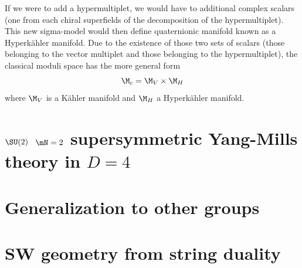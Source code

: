 \documentclass{worksheetclass}
\begin{document}
        If we were to add a hypermultiplet, we would have to additional complex scalars (one from each chiral superfields of the decomposition of the hypermultiplet). This new sigma-model would then define quaternionic manifold known as a Hyperkähler manifold. Due to the existence of those two sets of scalars (those belonging to the vector multiplet and those belonging to the hypermultiplet), the classical moduli space has the more general form
        \begin{equation}
            \M_c=\M_V\times\M_H
        \end{equation}
        where $\M_V$ is a Kähler manifold and $\M_H$ a Hyperkähler manifold.


    \section{$\SU(2)$ $\mN=2$ supersymmetric Yang-Mills theory in $D=4$}

    

\section{Generalization to other groups}

\section{SW geometry from string duality}



\printbibliography
\end{document}
